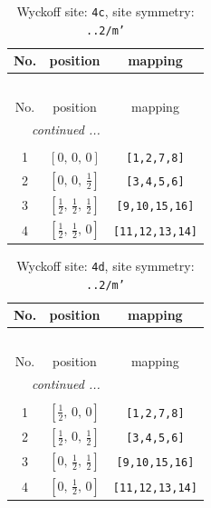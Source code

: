 \documentclass[fleqn,8pt]{jsarticle}
\begin{document}
\renewcommand{\arraystretch}{1.2}
\begin{longtable}{ccc}
\caption{Wyckoff site: {\tt 4c}, site symmetry: {\tt ..2/m'}}
 \\
 \hline \hline
No. & position & mapping \\ \hline \endfirsthead

\multicolumn{2}{l}{\tablename\ \thetable{}} \\
 \hline \hline
No. & position & mapping \\ \hline \endhead

 \hline \hline
\multicolumn{2}{r}{\footnotesize\it continued ...} \\ \endfoot

 \hline \hline
\multicolumn{2}{r}{} \\ \endlastfoot

1 & $\left[ 0,\, 0,\, 0 \right]$ & {\tt [1,2,7,8]} \\ \hline
2 & $\left[ 0,\, 0,\, \frac{1}{2} \right]$ & {\tt [3,4,5,6]} \\ \hline
3 & $\left[ \frac{1}{2},\, \frac{1}{2},\, \frac{1}{2} \right]$ & {\tt [9,10,15,16]} \\ \hline
4 & $\left[ \frac{1}{2},\, \frac{1}{2},\, 0 \right]$ & {\tt [11,12,13,14]} \\
\end{longtable}
\renewcommand{\arraystretch}{1.2}
\begin{longtable}{ccc}
\caption{Wyckoff site: {\tt 4d}, site symmetry: {\tt ..2/m'}}
 \\
 \hline \hline
No. & position & mapping \\ \hline \endfirsthead

\multicolumn{2}{l}{\tablename\ \thetable{}} \\
 \hline \hline
No. & position & mapping \\ \hline \endhead

 \hline \hline
\multicolumn{2}{r}{\footnotesize\it continued ...} \\ \endfoot

 \hline \hline
\multicolumn{2}{r}{} \\ \endlastfoot

1 & $\left[ \frac{1}{2},\, 0,\, 0 \right]$ & {\tt [1,2,7,8]} \\ \hline
2 & $\left[ \frac{1}{2},\, 0,\, \frac{1}{2} \right]$ & {\tt [3,4,5,6]} \\ \hline
3 & $\left[ 0,\, \frac{1}{2},\, \frac{1}{2} \right]$ & {\tt [9,10,15,16]} \\ \hline
4 & $\left[ 0,\, \frac{1}{2},\, 0 \right]$ & {\tt [11,12,13,14]} \\
\end{longtable}
\end{document}

